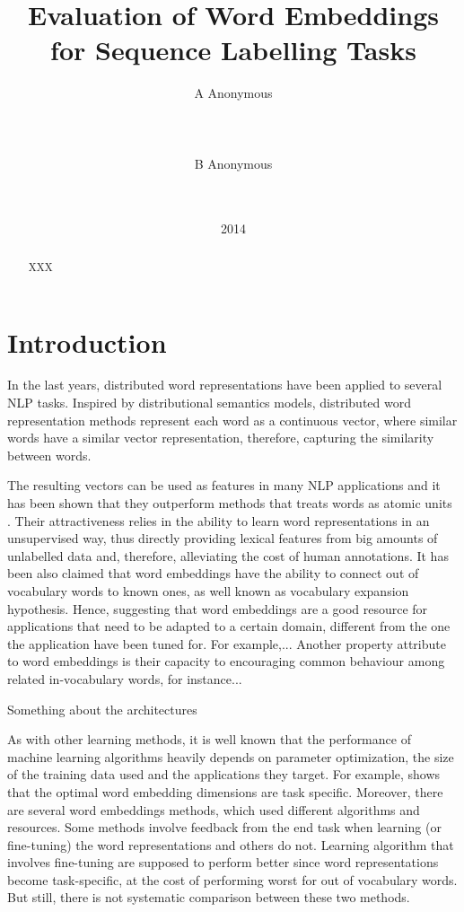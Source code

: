 \documentclass[11pt]{article}
\title{Evaluation of Word Embeddings for Sequence Labelling Tasks}
\author{A Anonymous 
   \\%
   \\ %
   \\ %
  \\ %
\And
  B Anonymous
   \\%
   \\%
   \\ %
}
\date{2014}
\begin{document}
\maketitle
\begin{abstract}
XXX
\end{abstract}

\newcommand{\gabi}[1]{\textcolor{blue}{#1}}
\newcommand{\tim}[1]{\textcolor{red}{#1}}
\newcommand{\lizhen}[1]{\textcolor{green}{#1}}
\newcommand{\nss}[1]{\textcolor{magenta}{#1}}

\section{Introduction}
In the last years, distributed word representations
have been applied to several NLP tasks.
Inspired by distributional semantics models, distributed word
representation methods represent each word as a continuous vector, where similar words have a similar vector representation, therefore, capturing the similarity between words.

The resulting vectors can be used as features in many NLP applications and it has been shown that they outperform methods that treats words as atomic units \cite{}.  
Their attractiveness relies in the ability to learn word representations in an unsupervised way, thus directly providing lexical features from big amounts of unlabelled data 
and, therefore, alleviating the cost of human annotations.
It has been also claimed that word embeddings
have the ability to connect out of vocabulary words to known ones, as well known as vocabulary expansion hypothesis. 
Hence, suggesting that word embeddings are a good resource 
for applications that need to be adapted to a certain domain, 
different from the one the application have been tuned for.
For example,...
Another property attribute to word embeddings is their 
capacity to encouraging common behaviour among related in-vocabulary words, for instance...

Something about the architectures

As with other learning methods, it is well known that
the performance of machine learning algorithms heavily depends on
parameter optimization, the size of the training data used and the applications they target.
For example, \cite{turian2010word} shows that the optimal word embedding dimensions are task specific.
Moreover, there are several word embeddings methods, which used different algorithms and resources. 
Some methods involve feedback from the end task when learning (or fine-tuning) the word representations and others do not. 
Learning algorithm that involves fine-tuning are supposed
to perform better since word representations become
task-specific, at the cost of performing worst for out of vocabulary 
words. But still, there is not systematic comparison between
these two methods. 
\end{document}
